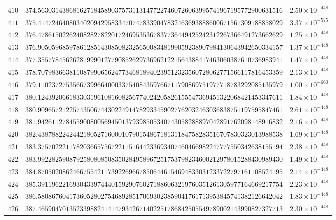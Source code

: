 \documentclass[12pt,reqno]{amsart}
\theoremstyle{remark}
\begin{document}
\begin{longtable}{clc}
$410$ & $374.5630314386816271845890375731131477227460726063995741967195772900631516$ & $2.50\times 10^{-448}$ \\
$411$ & $375.4147246408034020942958334707478339047832463693888600671561309188858029$ & $3.37\times 10^{-575}$ \\
$412$ & $376.4786150226240828278220172469535367837736449425242312267366491273662629$ & $1.25\times 10^{-448}$ \\
$413$ & $376.9050596859786128514308508232565008348199059238907984130643942650334157$ & $1.37\times 10^{-448}$ \\
$414$ & $377.3557784562628199901277908526297369621221564388417463060387610736983941$ & $1.47\times 10^{-448}$ \\
$415$ & $378.7079836638110879906562477346818940239512323560728062771566117816453359$ & $2.13\times 10^{-448}$ \\
$416$ & $379.1102372753566739966400033754084359766711790869751977718783292085135979$ & $1.00\times 10^{-660}$ \\
$417$ & $380.1243920661833031961081608256774024205826155547369451322068421453347611$ & $1.84\times 10^{-448}$ \\
$418$ & $380.9096572122574350674430224914782933459027762032463036838751197595847461$ & $2.61\times 10^{-448}$ \\
$419$ & $381.9426112784559008005694501379398505340743058288897042891762098148916832$ & $2.16\times 10^{-448}$ \\
$420$ & $382.4387882242442180527160001079015486718131184758283516707830323013988538$ & $1.69\times 10^{-448}$ \\
$421$ & $383.3757022211782036657567221151644233693407460466982247777550342638155194$ & $2.38\times 10^{-448}$ \\
$422$ & $383.9922825908792580808508350284958967251753798234600212978015288430989430$ & $1.49\times 10^{-448}$ \\
$423$ & $384.8705020862466755421173922696678506446154694833031233722797161108524195$ & $2.14\times 10^{-448}$ \\
$424$ & $385.3911962216930433974440159290760271886063219760351261305977164669217754$ & $2.23\times 10^{-448}$ \\
$425$ & $386.5808676041736052802754689285170693023859041761713953845741382126642042$ & $1.83\times 10^{-448}$ \\
$426$ & $387.4659047013523398824141479342671402251786842505549789002143990827327713$ & $2.30\times 10^{-448}$ \\

\end{longtable}
\end{document}
